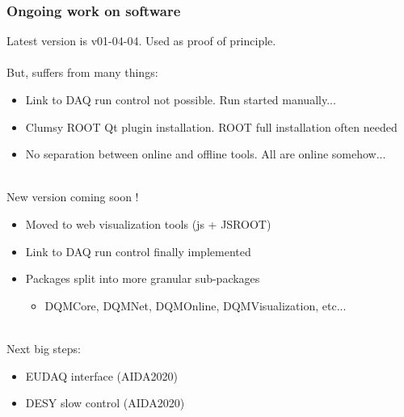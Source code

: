 \documentclass[presentation, 10pt]{beamer}
\begin{document}
\begin{frame}
  \frametitle{Ongoing work on software}
  \footnotesize
  Latest version is v01-04-04. Used as proof of principle. \\
  ~\\
  But, suffers from many things:
  \begin{itemize}
    \item Link to DAQ run control not possible. Run started manually...
    \item Clumsy ROOT Qt plugin installation. ROOT full installation often needed
    \item No separation between online and offline tools. All are online somehow...
  \end{itemize}
  ~\\
  New version coming soon !
  \begin{itemize}
    \item Moved to web visualization tools (js + JSROOT)
    \item Link to DAQ run control finally implemented
    \item Packages split into more granular sub-packages
    \begin{itemize}
      \scriptsize
      \item DQMCore, DQMNet, DQMOnline, DQMVisualization, etc...
    \end{itemize}
  \end{itemize}
  ~\\
  Next big steps:
  \begin{itemize}
    \item EUDAQ interface (AIDA2020)
    \item DESY slow control (AIDA2020) 
  \end{itemize}
\end{frame}
\end{document}
